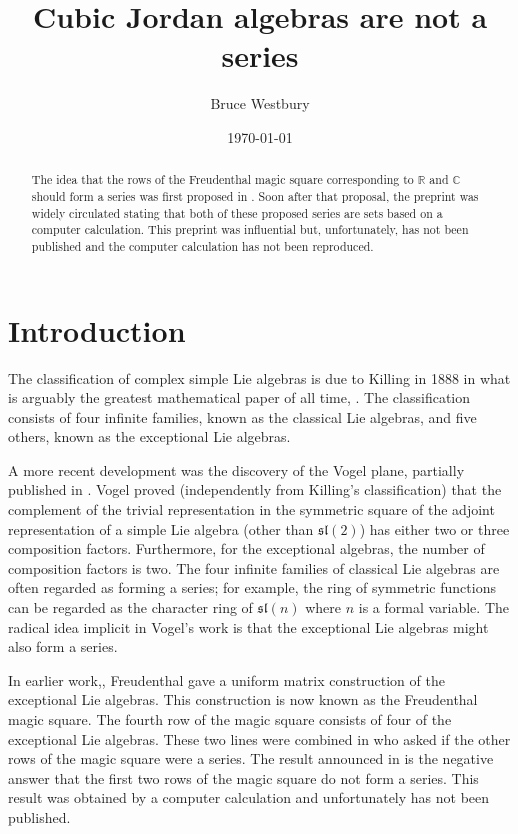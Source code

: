 \documentclass[12pt]{amsart}
\newcommand\bC{\mathbb{C}}
\newcommand\bR{\mathbb{R}}
\newcommand\fsl{\mathfrak{sl}}
\begin{document}
\title{Cubic Jordan algebras are not a series}
\author{Bruce Westbury}
\date{\today}
\begin{abstract}
The idea that the rows of the Freudenthal magic square corresponding to $\bR$ and $\bC$ should form a
series was first proposed in \cite{Deligne2002}. Soon after that proposal, the preprint 
\cite{Thurston2004} was widely circulated stating that both of these proposed series are sets
based on a computer calculation. This preprint was influential but, unfortunately,
has not been published and the computer calculation has not been reproduced. 
\end{abstract}
\maketitle
\tableofcontents



\section{Introduction}
The classification of complex simple Lie algebras is due to Killing in 1888 in what is arguably the greatest
mathematical paper of all time, \cite{coleman1989}. The classification consists of four infinite families, known as the classical Lie algebras, and five others, known as the exceptional Lie algebras.

A more recent development was the discovery of the Vogel plane, partially published in \cite{Vogel2011}.
Vogel proved (independently from Killing's classification) that the complement of the trivial representation in the symmetric square of the adjoint representation of a simple Lie algebra (other than $\fsl(2)$) has either two or three composition factors. Furthermore, for the exceptional algebras, the number of composition factors is two.
The four infinite families of classical Lie algebras are often regarded as forming a series; for example,
the ring of symmetric functions can be regarded as the character ring of $\fsl(n)$ where $n$ is a formal variable. The radical idea implicit in Vogel's work is that the exceptional Lie algebras might also form 
a series.

In earlier work,\cite{Freudenthal1964}, Freudenthal gave a uniform matrix construction of the exceptional
Lie algebras. This construction is now known as the Freudenthal magic square. The fourth row of the magic square consists of four of the exceptional Lie algebras. These two lines were combined
in \cite{Deligne2002} who asked if the other rows of the magic square were a series. The result announced in
\cite{Thurston2004} is the negative answer that the first two rows of the magic square do not form a series. This result was obtained by a computer calculation and unfortunately has not been published.
\end{document}
